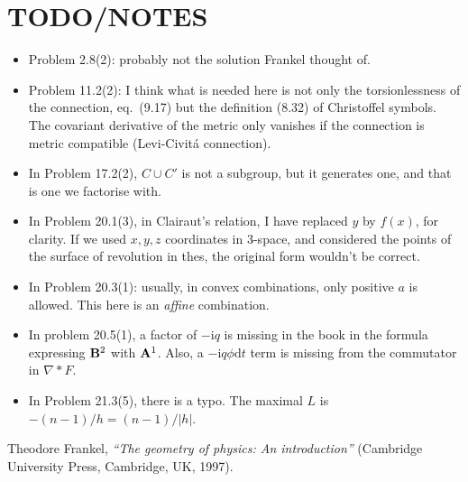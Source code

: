 \documentclass[a4paper,12pt]{article}
\def\d{\mathrm{d}}
\def\imagi{\mathrm{i}}
\begin{document}

\section*{TODO/NOTES}
\begin{itemize}
 \item Problem 2.8(2): probably not the solution Frankel thought of.

 \item Problem 11.2(2): I think what is needed here is not only the torsionlessness of the connection, eq.\ (9.17) but the definition (8.32) of Christoffel symbols. The covariant derivative of the metric only vanishes if the connection is metric compatible (Levi-Civitá connection).

 \item In Problem 17.2(2), $C\cup C'$ is not a subgroup, but it generates one, and that is one we factorise with.

 \item In Problem 20.1(3), in Clairaut's relation, I have replaced $y$ by $f(x)$, for clarity. If we used $x, y, z$ coordinates in 3-space, and considered the points of the surface of revolution in thes, the original form wouldn't be correct.

 \item In Problem 20.3(1): usually, in convex combinations, only positive $a$ is allowed. This here is an {\sl affine}\/ combination.

 \item In problem 20.5(1), a factor of $-\imagi q$ is missing in the book in the formula expressing ${\bf B}^2$ with ${\bf A}^1$. Also, a $-\imagi q \phi \d t$ term is missing from the commutator in $\nabla *F$.

 \item In Problem 21.3(5), there is a typo. The maximal $L$ is $-(n-1)/h = (n-1)/|h|$.
\end{itemize}


\begin{thebibliography}{99}
 Theodore Frankel, {\sl ``The geometry of physics: An introduction''}\/ (Cambridge University Press, Cambridge, UK, 1997).

\end{thebibliography}
\end{document}

